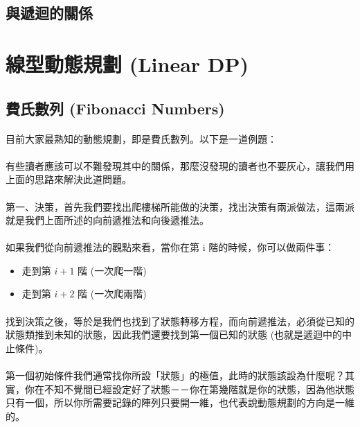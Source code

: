 \documentclass[12pt,a4paper,oneside]{report}
\begin{document}
\begin{CJK}{UTF8}{bkai}
\subsection{與遞迴的關係}

\section{線型動態規劃 (Linear DP)}

\subsection{費氏數列 (Fibonacci Numbers)}

\paragraph{}目前大家最熟知的動態規劃，即是費氏數列。以下是一道例題：
\paragraph{}有些讀者應該可以不難發現其中的關係，那麼沒發現的讀者也不要灰心，讓我們用上面的思路來解決此道問題。
\paragraph{}第一、決策，首先我們要找出爬樓梯所能做的決策，找出決策有兩派做法，這兩派就是我們上面所述的向前遞推法和向後遞推法。
\paragraph{}如果我們從向前遞推法的觀點來看，當你在第 i 階的時候，你可以做兩件事：

\begin{itemize}
\item 走到第 $i+1$ 階 (一次爬一階)
\item 走到第 $i+2$ 階 (一次爬兩階)
\end{itemize}

\paragraph{}找到決策之後，等於是我們也找到了狀態轉移方程，而向前遞推法，必須從已知的狀態類推到未知的狀態，因此我們還要找到第一個已知的狀態 (也就是遞迴中的中止條件)。
\paragraph{}第一個初始條件我們通常找你所設「狀態」的極值，此時的狀態該設為什麼呢？其實，你在不知不覺間已經設定好了狀態－－你在第幾階就是你的狀態，因為他狀態只有一個，所以你所需要記錄的陣列只要開一維，也代表說動態規劃的方向是一維的。


\end{CJK}
\end{document}
